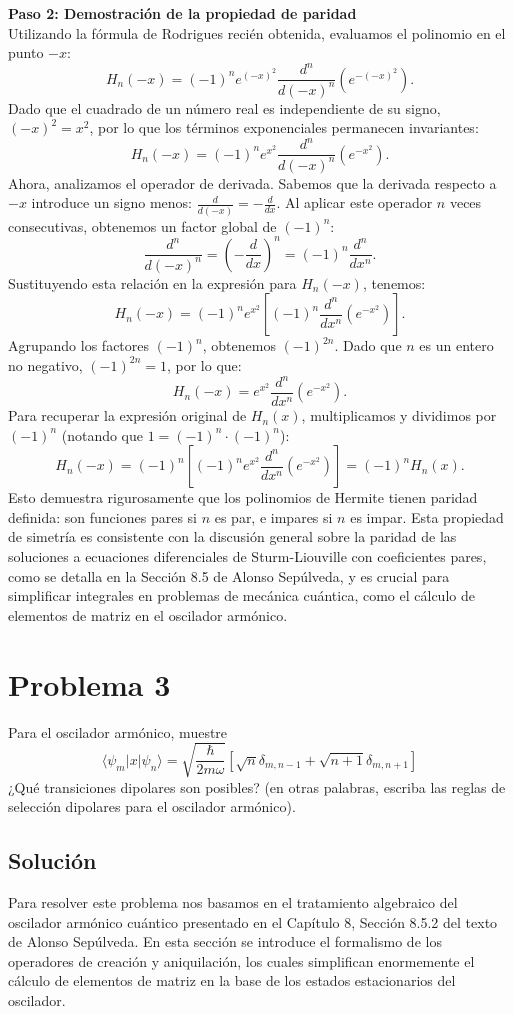 \documentclass[a4paper]{article}
\begin{document}
\vspace{0.3cm}
\noindent\textbf{Paso 2: Demostración de la propiedad de paridad} \\
Utilizando la fórmula de Rodrigues recién obtenida, evaluamos el polinomio en el punto $-x$:
$$
H_n(-x) = (-1)^n e^{(-x)^2} \frac{d^n}{d(-x)^n} \left( e^{-(-x)^2} \right).
$$
Dado que el cuadrado de un número real es independiente de su signo, $(-x)^2 = x^2$, por lo que los términos exponenciales permanecen invariantes:
$$
H_n(-x) = (-1)^n e^{x^2} \frac{d^n}{d(-x)^n} \left( e^{-x^2} \right).
$$
Ahora, analizamos el operador de derivada. Sabemos que la derivada respecto a $-x$ introduce un signo menos: $\frac{d}{d(-x)} = -\frac{d}{dx}$. Al aplicar este operador $n$ veces consecutivas, obtenemos un factor global de $(-1)^n$:
$$
\frac{d^n}{d(-x)^n} = \left( -\frac{d}{dx} \right)^n = (-1)^n \frac{d^n}{dx^n}.
$$
Sustituyendo esta relación en la expresión para $H_n(-x)$, tenemos:
$$
H_n(-x) = (-1)^n e^{x^2} \left[ (-1)^n \frac{d^n}{dx^n} \left( e^{-x^2} \right) \right].
$$
Agrupando los factores $(-1)^n$, obtenemos $(-1)^{2n}$. Dado que $n$ es un entero no negativo, $(-1)^{2n} = 1$, por lo que:
$$
H_n(-x) = e^{x^2} \frac{d^n}{dx^n} \left( e^{-x^2} \right).
$$
Para recuperar la expresión original de $H_n(x)$, multiplicamos y dividimos por $(-1)^n$ (notando que $1 = (-1)^n \cdot (-1)^n$):
$$
H_n(-x) = (-1)^n \left[ (-1)^n e^{x^2} \frac{d^n}{dx^n} \left( e^{-x^2} \right) \right] = (-1)^n H_n(x).
$$
Esto demuestra rigurosamente que los polinomios de Hermite tienen paridad definida: son funciones pares si $n$ es par, e impares si $n$ es impar. Esta propiedad de simetría es consistente con la discusión general sobre la paridad de las soluciones a ecuaciones diferenciales de Sturm-Liouville con coeficientes pares, como se detalla en la Sección 8.5 de Alonso Sepúlveda, y es crucial para simplificar integrales en problemas de mecánica cuántica, como el cálculo de elementos de matriz en el oscilador armónico.


\section{Problema 3}
Para el oscilador armónico, muestre
$$
\langle \psi_m | x | \psi_n \rangle = \sqrt{\frac{\hbar}{2m\omega}} \left[ \sqrt{n} \delta_{m,n-1} + \sqrt{n+1} \delta_{m,n+1} \right]
$$
¿Qué transiciones dipolares son posibles? (en otras palabras, escriba las reglas de selección dipolares para el oscilador armónico).

\subsection{Solución}
Para resolver este problema nos basamos en el tratamiento algebraico del oscilador armónico cuántico presentado en el Capítulo 8, Sección 8.5.2 del texto de Alonso Sepúlveda. En esta sección se introduce el formalismo de los operadores de creación y aniquilación, los cuales simplifican enormemente el cálculo de elementos de matriz en la base de los estados estacionarios del oscilador.
\end{document}
